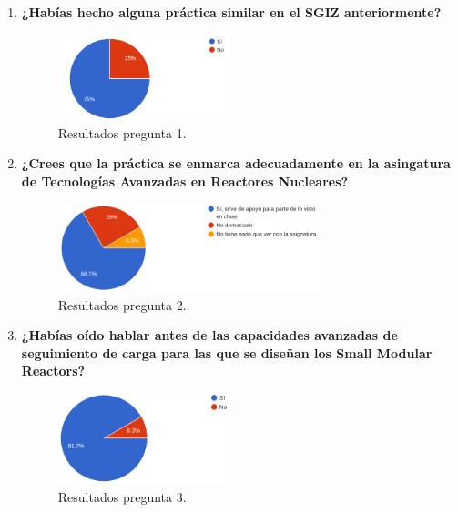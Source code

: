 \begin{enumerate}
    \item \textbf{¿Habías hecho alguna práctica similar en el SGIZ anteriormente?}
    
    \begin{figure}[!h]
        \centering
        \includegraphics[width=0.47\textwidth]{content/figures/encuesta_1.png}
        \caption{Resultados pregunta 1.}
        \label{fig:encuesta_1}
    \end{figure}

    \item \textbf{¿Crees que la práctica se enmarca adecuadamente en la asingatura de Tecnologías Avanzadas en Reactores Nucleares?}
    
    \begin{figure}[!h]
        \centering
        \includegraphics[width=0.72\textwidth]{content/figures/encuesta_2.png}
        \caption{Resultados pregunta 2.}
        \label{fig:encuesta_2}
    \end{figure}
    
    \item \textbf{¿Habías oído hablar antes de las capacidades avanzadas de seguimiento de carga para las que se diseñan los Small Modular Reactors?}
    
    \begin{figure}[!h]
        \centering
        \includegraphics[width=0.47\textwidth]{content/figures/encuesta_3.png}
        \caption{Resultados pregunta 3.}
        \label{fig:encuesta_3}
    \end{figure}
    

\end{enumerate}
